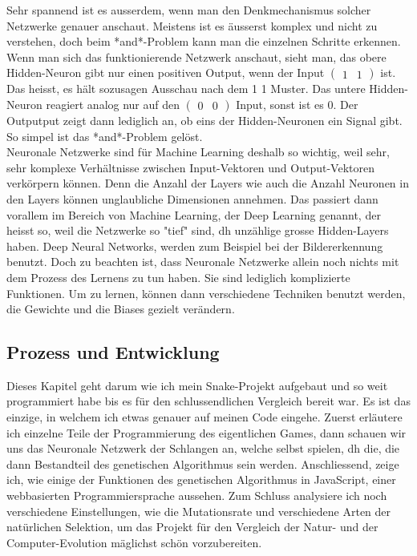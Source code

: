 \documentclass[10pt,a4paper,ngerman,english]{article}
\begin{document}
Sehr spannend ist es ausserdem, wenn man den Denkmechanismus solcher Netzwerke genauer anschaut. Meistens ist es äusserst komplex und nicht zu verstehen, doch beim *and*-Problem kann man die einzelnen Schritte erkennen. Wenn man sich das funktionierende Netzwerk anschaut, sieht man, das obere Hidden-Neuron gibt nur einen positiven Output, wenn der Input $ \left(\begin{array}{cc} 1 & 1\end{array}\right) $ ist. Das heisst, es hält sozusagen Ausschau nach dem 1 1 Muster. Das untere Hidden-Neuron reagiert analog nur auf den $ \left(\begin{array}{cc} 0 & 0\end{array}\right) $ Input, sonst ist es 0. Der Outputput zeigt dann lediglich an, ob eins der Hidden-Neuronen ein Signal gibt. So simpel ist das *and*-Problem gelöst.\\

Neuronale Netzwerke sind für Machine Learning deshalb so wichtig, weil sehr, sehr komplexe Verhältnisse zwischen Input-Vektoren und Output-Vektoren verkörpern können. Denn die Anzahl der Layers wie auch die Anzahl Neuronen in den Layers können unglaubliche Dimensionen annehmen. Das passiert dann vorallem im Bereich von Machine Learning, der Deep Learning genannt, der heisst so, weil die Netzwerke so "tief" sind, dh unzählige grosse Hidden-Layers haben. Deep Neural Networks, werden zum Beispiel bei der Bildererkennung benutzt. Doch zu beachten ist, dass Neuronale Netzwerke allein noch nichts mit dem Prozess des Lernens zu tun haben. Sie sind lediglich komplizierte Funktionen. Um zu lernen, können dann verschiedene Techniken benutzt werden, die Gewichte und die Biases gezielt verändern.

\subsection{Prozess und Entwicklung}

Dieses Kapitel geht darum wie ich mein Snake-Projekt aufgebaut und so weit programmiert habe bis es für den schlussendlichen Vergleich bereit war. Es ist das einzige, in welchem ich etwas genauer auf meinen Code eingehe. Zuerst erläutere ich einzelne Teile der Programmierung des eigentlichen Games, dann schauen wir uns das Neuronale Netzwerk der Schlangen an, welche selbst spielen, dh die, die dann Bestandteil des genetischen Algorithmus sein werden. Anschliessend, zeige ich, wie einige der Funktionen des genetischen Algorithmus in JavaScript, einer webbasierten Programmiersprache aussehen. Zum Schluss analysiere ich noch verschiedene Einstellungen, wie die Mutationsrate und verschiedene Arten der natürlichen Selektion, um das Projekt für den Vergleich der Natur- und der Computer-Evolution mäglichst schön vorzubereiten.
\end{document}
